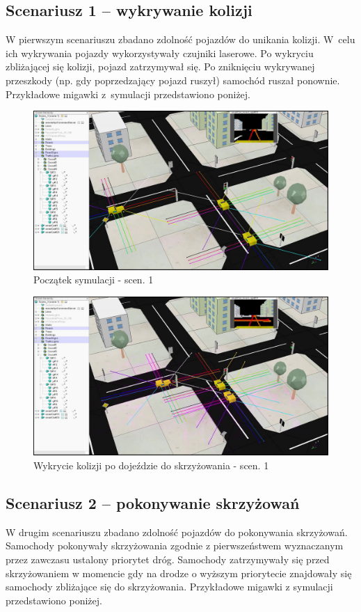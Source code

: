 
\subsection{Scenariusz 1 -- wykrywanie kolizji}
W pierwszym scenariuszu zbadano zdolność pojazdów do unikania kolizji. W~celu ich wykrywania pojazdy wykorzystywały czujniki laserowe. Po wykryciu zbliżającej się kolizji, pojazd zatrzymywał się. Po zniknięciu wykrywanej przeszkody (np. gdy poprzedzający pojazd ruszył) samochód ruszał ponownie. Przykładowe migawki z~symulacji przedstawiono poniżej. \vspace{-0.1cm}

\begin{figure}[H]
	\centering
	\centering
	\includegraphics[width=.6\linewidth]{p11.jpg}
	\caption{Początek symulacji - scen. 1}
	\label{fig:p11}
\end{figure} \vspace{-0.5cm}

\begin{figure}[H]
	\centering
	\centering
	\includegraphics[width=.6\linewidth]{p12.jpg}
	\caption{Wykrycie kolizji po dojeździe do skrzyżowania - scen. 1}
	\label{fig:p12}
\end{figure}

\subsection{Scenariusz 2 -- pokonywanie skrzyżowań}

W drugim scenariuszu zbadano zdolność pojazdów do pokonywania skrzyżowań. Samochody pokonywały skrzyżowania zgodnie z pierwszeństwem wyznaczanym przez zawczasu ustalony priorytet dróg. Samochody zatrzymywały się przed skrzyżowaniem w momencie gdy na drodze o wyższym priorytecie znajdowały się samochody zbliżające się do skrzyżowania. Przykładowe migawki z symulacji przedstawiono poniżej.

